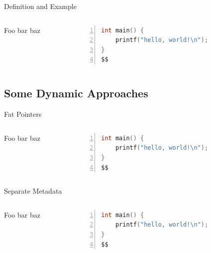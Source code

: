 \documentclass[aspectratio=169]{beamer}
\begin{document}
\begin{frame}[fragile]{Definition and Example}
  \footnotesize
  \begin{columns}[T]
    \begin{column}{0.45\textwidth}
        Foo bar baz
    \end{column}
    \begin{column}{0.45\textwidth}
%      
       \begin{lstlisting}[language=C,numbers=left,mathescape,basicstyle={\footnotesize\ttfamily}]
int main() {
    printf("hello, world!\n");
}
$$
        \end{lstlisting}
    \end{column}
  \end{columns}
\end{frame}

\subsection{Some Dynamic Approaches}

\begin{frame}[fragile]{Fat Pointers}
  \footnotesize
  \begin{columns}[T]
    \begin{column}{0.45\textwidth}
        Foo bar baz
    \end{column}
    \begin{column}{0.45\textwidth}
%      
       \begin{lstlisting}[language=C,numbers=left,mathescape,basicstyle={\footnotesize\ttfamily}]
int main() {
    printf("hello, world!\n");
}
$$
        \end{lstlisting}
    \end{column}
  \end{columns}
\end{frame}

\begin{frame}[fragile]{Separate Metadata}
  \footnotesize
  \begin{columns}[T]
    \begin{column}{0.45\textwidth}
        Foo bar baz
    \end{column}
    \begin{column}{0.45\textwidth}
%      
       \begin{lstlisting}[language=C,numbers=left,mathescape,basicstyle={\footnotesize\ttfamily}]
int main() {
    printf("hello, world!\n");
}
$$
        \end{lstlisting}
    \end{column}
  \end{columns}
\end{frame}
\end{document}
